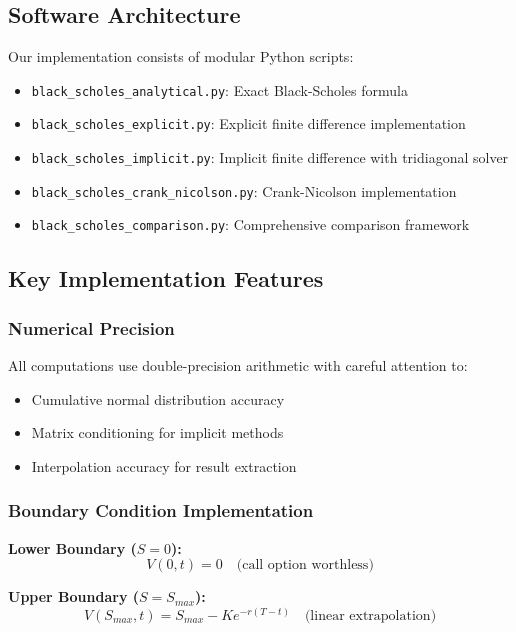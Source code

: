 \documentclass[12pt,a4paper]{article}
\numberwithin{algorithm}{subsection}
\begin{document}
\subsection{Software Architecture}

Our implementation consists of modular Python scripts:

\begin{itemize}
\item \texttt{black\_scholes\_analytical.py}: Exact Black-Scholes formula
\item \texttt{black\_scholes\_explicit.py}: Explicit finite difference implementation
\item \texttt{black\_scholes\_implicit.py}: Implicit finite difference with tridiagonal solver
\item \texttt{black\_scholes\_crank\_nicolson.py}: Crank-Nicolson implementation
\item \texttt{black\_scholes\_comparison.py}: Comprehensive comparison framework
\end{itemize}

\subsection{Key Implementation Features}

\subsubsection{Numerical Precision}

All computations use double-precision arithmetic with careful attention to:
\begin{itemize}
\item Cumulative normal distribution accuracy
\item Matrix conditioning for implicit methods
\item Interpolation accuracy for result extraction
\end{itemize}

\subsubsection{Boundary Condition Implementation}

\textbf{Lower Boundary ($S = 0$):}
\begin{equation}
V(0,t) = 0 \quad \text{(call option worthless)}
\end{equation}

\textbf{Upper Boundary ($S = S_{max}$):}
\begin{equation}
V(S_{max},t) = S_{max} - K e^{-r(T-t)} \quad \text{(linear extrapolation)}
\end{equation}
\end{document}
